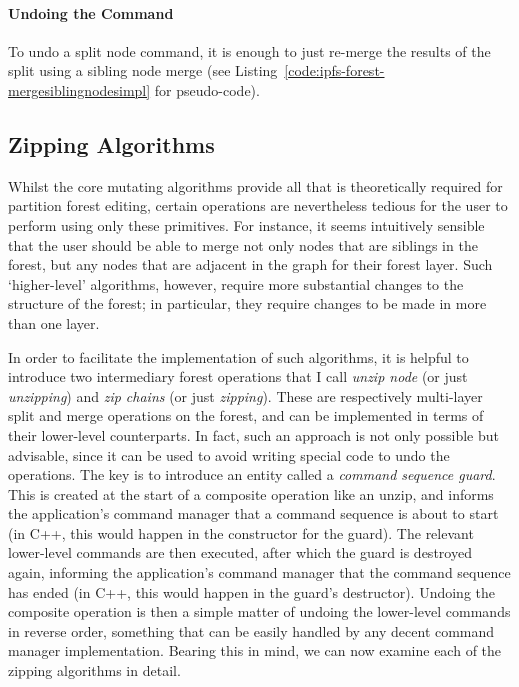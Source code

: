 \paragraph{Undoing the Command}

To undo a split node command, it is enough to just re-merge the results of the split using a sibling node merge (see Listing~\ref{code:ipfs-forest-mergesiblingnodesimpl} for pseudo-code).

\subsection{Zipping Algorithms}

Whilst the core mutating algorithms provide all that is theoretically required for partition forest editing, certain operations are nevertheless tedious for the user to perform using only these primitives. For instance, it seems intuitively sensible that the user should be able to merge not only nodes that are siblings in the forest, but any nodes that are adjacent in the graph for their forest layer. Such `higher-level' algorithms, however, require more substantial changes to the structure of the forest; in particular, they require changes to be made in more than one layer.

In order to facilitate the implementation of such algorithms, it is helpful to introduce two intermediary forest operations that I call \emph{unzip node} (or just \emph{unzipping}) and \emph{zip chains} (or just \emph{zipping}). These are respectively multi-layer split and merge operations on the forest, and can be implemented in terms of their lower-level counterparts. In fact, such an approach is not only possible but advisable, since it can be used to avoid writing special code to undo the operations. The key is to introduce an entity called a \emph{command sequence guard}. This is created at the start of a composite operation like an unzip, and informs the application's command manager that a command sequence is about to start (in C++, this would happen in the constructor for the guard). The relevant lower-level commands are then executed, after which the guard is destroyed again, informing the application's command manager that the command sequence has ended (in C++, this would happen in the guard's destructor). Undoing the composite operation is then a simple matter of undoing the lower-level commands in reverse order, something that can be easily handled by any decent command manager implementation. Bearing this in mind, we can now examine each of the zipping algorithms in detail.

